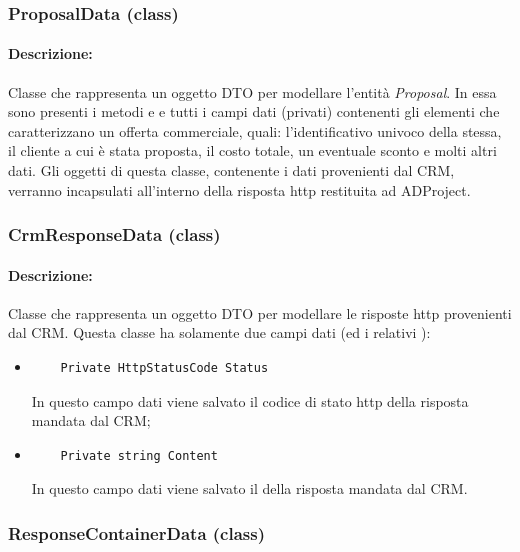 \subsubsection{ProposalData (class)}
\paragraph{Descrizione:}
Classe che rappresenta un oggetto \gls{DTO} per modellare l'entità \textit{Proposal}.
In essa sono presenti i metodi  e  e tutti i campi dati (privati) contenenti gli elementi che caratterizzano un offerta commerciale, quali: l'identificativo univoco della stessa, il cliente a cui è stata proposta, il costo totale, un eventuale sconto e molti altri dati.
Gli oggetti di questa classe, contenente i dati provenienti dal CRM, verranno incapsulati all'interno della risposta \gls{http} restituita ad ADProject.

\subsubsection{CrmResponseData (class)} \label{crmResponseDataClass}
\paragraph{Descrizione:}
Classe che rappresenta un oggetto \gls{DTO} per modellare le risposte \gls{http} provenienti dal \gls{CRM}.
Questa classe ha solamente due campi dati (ed i relativi ):
\begin{itemize}
	\item 	
	\begin{lstlisting}
	Private HttpStatusCode Status
	\end{lstlisting}
	In questo campo dati viene salvato il codice di stato \gls{http} della risposta mandata dal \gls{CRM};
	\item
	\begin{lstlisting}
	Private string Content
	\end{lstlisting}
	In questo campo dati viene salvato il  della risposta mandata dal \gls{CRM}.
\end{itemize}

\subsubsection{ResponseContainerData (class)} \label{responseContainerDataClass}
